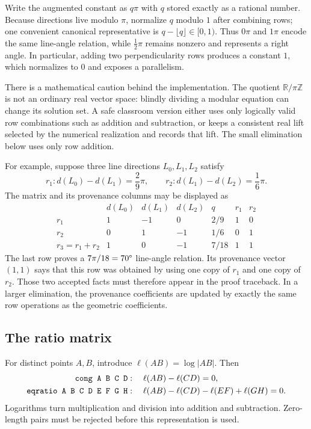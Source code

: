 \documentclass[reqno]{amsart}
\DeclareMathOperator{\1}{\textbf{1}}
\begin{document}
Write the augmented constant as $q\pi$ with $q$ stored exactly as a rational
number. Because directions live modulo $\pi$, normalize $q$ modulo $1$ after
combining rows; one convenient canonical representative is
$q-\lfloor q\rfloor\in[0,1)$. Thus $0\pi$ and $1\pi$ encode the same
line-angle relation, while $\tfrac12\pi$ remains nonzero and represents a
right angle. In particular, adding two perpendicularity rows produces a
constant $1$, which normalizes to $0$ and exposes a parallelism.

There is a mathematical caution behind the implementation. The quotient
$\mathbb R/\pi\mathbb Z$ is not an ordinary real vector space: blindly
dividing a modular equation can change its solution set. A safe classroom
version either uses only logically valid row combinations such as addition
and subtraction, or keeps a consistent real lift selected by the numerical
realization and records that lift. The small elimination below uses only row
addition.

For example, suppose three line directions $L_0,L_1,L_2$ satisfy
\[
r_1:d(L_0)-d(L_1)=\frac{2}{9}\pi,
\qquad
r_2:d(L_1)-d(L_2)=\frac{1}{6}\pi.
\]
The matrix and its provenance columns may be displayed as
\[
\begin{array}{c|rrr|c|cc}
 &d(L_0)&d(L_1)&d(L_2)&q& r_1&r_2\\ \hline
r_1&1&-1&0&2/9&1&0\\
r_2&0&1&-1&1/6&0&1\\ \hline
r_3=r_1+r_2&1&0&-1&7/18&1&1
\end{array}
\]
The last row proves a $7\pi/18=70\degree$ line-angle relation. Its provenance
vector $(1,1)$ says that this row was obtained by using one copy of $r_1$ and
one copy of $r_2$. Those two accepted facts must therefore appear in the proof
traceback. In a larger elimination, the provenance coefficients are updated
by exactly the same row operations as the geometric coefficients.

\subsection*{The ratio matrix}

For distinct points $A,B$, introduce $\ell(AB)=\log |AB|$.  Then
\[
\begin{aligned}
\verb|cong A B C D|&:\quad \ell(AB)-\ell(CD)=0,\\
\verb|eqratio A B C D E F G H|&:\quad
\ell(AB)-\ell(CD)-\ell(EF)+\ell(GH)=0.
\end{aligned}
\]
Logarithms turn multiplication and division into addition and subtraction.
Zero-length pairs must be rejected before this representation is used.
\end{document}
